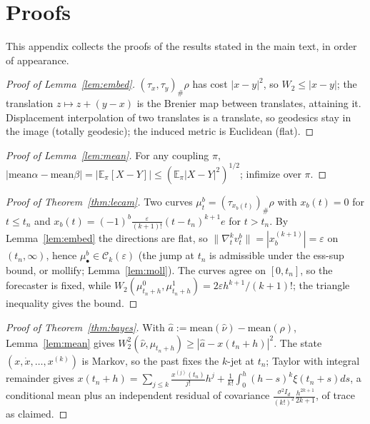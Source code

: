 \documentclass[11pt]{article}
\theoremstyle{definition}
\theoremstyle{remark}
\newcommand{\E}{\mathbb{E}}
\newcommand{\Ck}{\mathcal{C}_k(\varepsilon)}
\newcommand{\mean}{\mathrm{mean}}
\begin{document}
\appendix

\section{Proofs}\label{app:proofs}
This appendix collects the proofs of the results stated in the main text, in order of appearance.

\begin{proof}[Proof of Lemma~\ref{lem:embed}]
$(\tau_x,\tau_y)_\#\rho$ has cost $|x-y|^2$, so $W_2\le|x-y|$; the translation
$z\mapsto z+(y-x)$ is the Brenier map between translates, attaining it. Displacement
interpolation of two translates is a translate, so geodesics stay in the image
(totally geodesic); the induced metric is Euclidean (flat).
\end{proof}

\begin{proof}[Proof of Lemma~\ref{lem:mean}]
For any coupling $\pi$, $|\mean\alpha-\mean\beta|=|\E_\pi[X-Y]|\le(\E_\pi|X-Y|^2)^{1/2}$;
infimize over $\pi$.
\end{proof}

\begin{proof}[Proof of Theorem~\ref{thm:lecam}]
Two curves $\mu^b_t=(\tau_{x_b(t)})_\#\rho$ with $x_b(t)=0$ for $t\le t_n$ and
$x_b(t)=(-1)^b\frac{\varepsilon}{(k+1)!}(t-t_n)^{k+1}e$ for $t>t_n$. By
Lemma~\ref{lem:embed} the directions are flat, so $\|\nabla_t^k v^b_t\|=|x_b^{(k+1)}|=\varepsilon$
on $(t_n,\infty)$, hence $\mu^b_\bullet\in\Ck$ (the jump at $t_n$ is admissible under
the ess-sup bound, or mollify; Lemma~\ref{lem:moll}). The curves agree on $[0,t_n]$,
so the forecaster is fixed, while $W_2(\mu^0_{t_n+h},\mu^1_{t_n+h})=2\varepsilon
h^{k+1}/(k+1)!$; the triangle inequality gives the bound.
\end{proof}

\begin{proof}[Proof of Theorem~\ref{thm:bayes}]
With $\hat a:=\mean(\hat\nu)-\mean(\rho)$, Lemma~\ref{lem:mean} gives
$W_2^2(\hat\nu,\mu_{t_n+h})\ge|\hat a - x(t_n+h)|^2$. The state $(x,\dot x,\dots,x^{(k)})$
is Markov, so the past fixes the $k$-jet at $t_n$; Taylor with integral remainder gives
$x(t_n+h)=\sum_{j\le k}\frac{x^{(j)}(t_n)}{j!}h^j+\frac1{k!}\int_0^h(h-s)^k\xi(t_n+s)ds$,
a conditional mean plus an independent residual of covariance
$\frac{\sigma^2 I_d}{(k!)^2}\frac{h^{2k+1}}{2k+1}$, of trace as claimed.
\end{proof}
\end{document}
